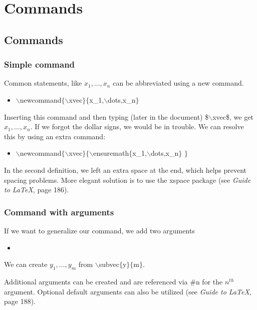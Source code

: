 \section[Commands]{Commands}
\subsection[Commands]{Commands}

\begin{frame}  \frametitle{Simple command}
	\newcommand{\xvec}{x_1, \ldots, x_n}
	Common statements, like $x_1, ..., x_n$ can be abbreviated using a new command.
	\begin{itemize}
		\item[] {\color{command}$\backslash$newcommand\color{braces}$\{${\color{command}$\backslash$xvec}$\}\{${\color{black}x\_1,{\color{command}$\backslash$dots},x\_n}$\}$}
	\end{itemize}
	Inserting this command and then typing (later in the document) {\color{braces}\$\color{command}$\backslash$xvec\color{braces}\$}, we get $\xvec$. If we forgot the dollar signs, we would be in trouble. We can resolve this by using an extra command:
	\begin{itemize}
		\item[] {\color{command}$\backslash$newcommand\color{braces}$\{${\color{command}$\backslash$xvec}$\}\{${\color{command}$\backslash$ensuremath{\color{braces}$\{$}{\color{black}x\_1,{\color{command}$\backslash$dots},x\_n}}$\}$ $\}$}
	\end{itemize}
	In the second definition, we left an extra space at the end, which helps prevent spacing problems. More elegant solution is to use the {\color{highlight}xspace} package (see \textit{Guide to LaTeX}, page 186).
\end{frame}

\newcommand{\subvec}[2]{\ensuremath{#1_{1}, \ldots, #1_{#2}} }
\begin{frame}  \frametitle{Command with arguments}
	If we want to generalize our command, we add two arguments
	\begin{itemize}
		\item[] 
	\end{itemize}
	We can create \subvec{y}{m} from {\color{command}$\backslash$subvec\color{braces}$\{${\color{black}y}$\}\{${\color{black}m}$\}$}.
	
	\vspace{7mm}
	
	Additional arguments can be created and are referenced via \#n for the $n^{th}$ argument. Optional default arguments can also be utilized (see \textit{Guide to LaTeX}, page 188).
\end{frame}

